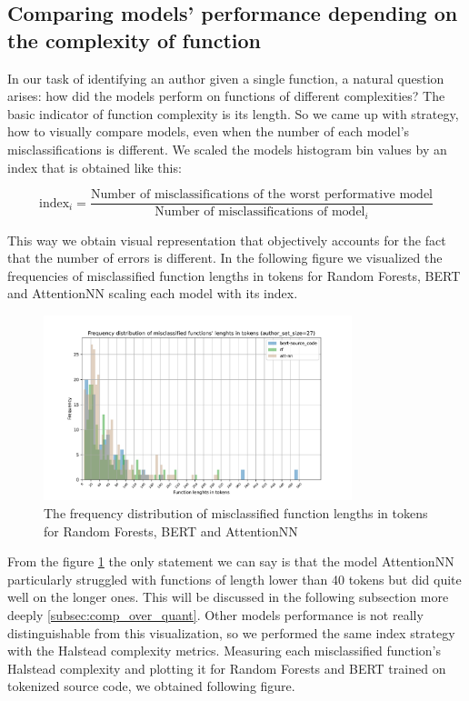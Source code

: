 \documentclass{article}
\begin{document}
\subsection{Comparing models' performance depending on the complexity of function}

In our task of identifying an author given a single function, a natural question arises: how did the models 
perform on functions of different complexities? The basic indicator of function complexity is its length. So we came up with strategy, 
how to visually compare models, even when the number of each model's misclassifications is different. We scaled the models histogram bin values by 
an index that is obtained like this: 

\begin{equation}
    \text{index}_{i} = \frac{\text{Number of misclassifications of the worst performative model}}{\text{Number of misclassifications of model}_{i}}
\end{equation}

This way we obtain visual representation that objectively accounts for the fact that the number of errors is different.
In the following figure we visualized the frequencies of misclassified function lengths in tokens for Random Forests, BERT and AttentionNN scaling each 
model with its index.


\begin{figure}[H] 
    \centering
    \includegraphics[width=0.8\textwidth]{figures/misclass_lens.pdf}
    \caption{The frequency distribution of misclassified function lengths in tokens for Random Forests, BERT and AttentionNN}
    \label{fig:misclass_lens}
\end{figure}

From the figure \ref{fig:misclass_lens} the only statement we can say is that the model AttentionNN particularly struggled with functions of length lower than 40 tokens
but did quite well on the longer ones. This will be discussed in the following subsection more deeply \ref{subsec:comp_over_quant}.
Other models performance is not really distinguishable from this visualization, so we performed the same index strategy with the Halstead complexity metrics.
Measuring each misclassified function's Halstead complexity and plotting it for Random Forests and BERT trained on tokenized source code, we obtained following figure.
\end{document}

